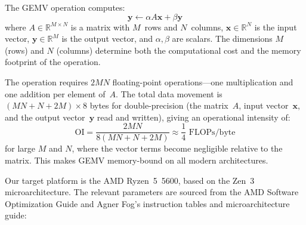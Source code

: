 \documentclass[conference]{IEEEtran}
\begin{document}
The GEMV operation computes:
\begin{equation}
\mathbf{y} \leftarrow \alpha A \mathbf{x} + \beta \mathbf{y}
\label{eq:gemv}
\end{equation}
where $A \in \mathbb{R}^{M \times N}$ is a matrix with $M$~rows and $N$~columns,
$\mathbf{x} \in \mathbb{R}^N$ is the input vector,
$\mathbf{y} \in \mathbb{R}^M$ is the output vector, and $\alpha, \beta$ are
scalars. The dimensions $M$ (rows) and $N$ (columns) determine both the
computational cost and the memory footprint of the operation.

The operation requires $2MN$ floating-point operations---one multiplication and one addition
per element of~$A$. The total data movement is $(MN + N + 2M) \times 8$ bytes
for double-precision (the matrix~$A$, input vector~$\mathbf{x}$, and the
output vector~$\mathbf{y}$ read and written), giving an operational intensity\cite{roofline} of:
\begin{equation}
\text{OI} = \frac{2MN}{8(MN + N + 2M)} \approx \frac{1}{4} \text{ FLOPs/byte}
\label{eq:ai}
\end{equation}
for large $M$ and $N$, where the vector terms become negligible relative to the
matrix. This makes GEMV memory-bound on all modern
architectures.

Our target platform is the AMD Ryzen~5~5600, based on the Zen~3
microarchitecture. The relevant parameters are sourced from the AMD Software
Optimization Guide\cite{amdsog} and Agner Fog's instruction
tables\cite{fog2011instruction} and microarchitecture guide\cite{fog2017microarchitecture}:
\end{document}
